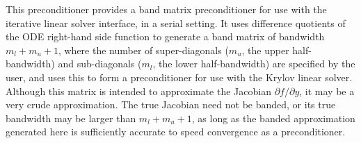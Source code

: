 
This preconditioner provides a band matrix preconditioner for use with
the {\cvspils} iterative linear solver interface, in a serial setting.
It uses difference quotients of the ODE right-hand side function  to
generate a band matrix of bandwidth $m_l + m_u + 1$, where the number of
super-diagonals ($m_u$, the upper half-bandwidth) and sub-diagonals
($m_l$, the lower half-bandwidth) are specified by the user, and uses this to
form a preconditioner for use with the Krylov linear solver.
Although this matrix is intended to approximate the Jacobian
$\partial f / \partial y$, it may be a very crude approximation.  The true Jacobian
need not be banded, or its true bandwidth may be larger than $m_l + m_u + 1$, as
long as the banded approximation generated here is sufficiently accurate to
speed convergence as a preconditioner. 

